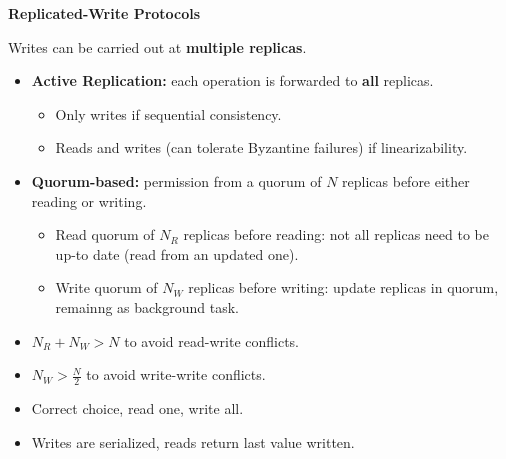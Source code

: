 \documentclass[a4paper, 10pt, twocolumn]{article}
\begin{document}
    \textbf{Replicated-Write Protocols}

    Writes can be carried out at \textbf{multiple replicas}.
    \begin{itemize}
        \item \textbf{Active Replication:} each operation is forwarded to \textbf{all} replicas.
            \begin{itemize}
                \item Only writes if sequential consistency.
                \item Reads and writes (can tolerate Byzantine failures) if linearizability.
            \end{itemize}
        \item \textbf{Quorum-based:} permission from a quorum of $N$ replicas before either reading or writing.
        \begin{itemize}
            \item Read quorum of $N_R$ replicas before reading: not all replicas need to be up-to date (read from an updated one).
            \item Write quorum of $N_W$ replicas before writing: update replicas in quorum, remainng as background task.
        \end{itemize}
        \item $N_R + N_W > N$ to avoid read-write conflicts.
        \item $N_W > \frac{N}{2}$ to avoid write-write conflicts.
        \item Correct choice, read one, write all.
        \item Writes are serialized, reads return last value written.
    \end{itemize}
\end{document}
